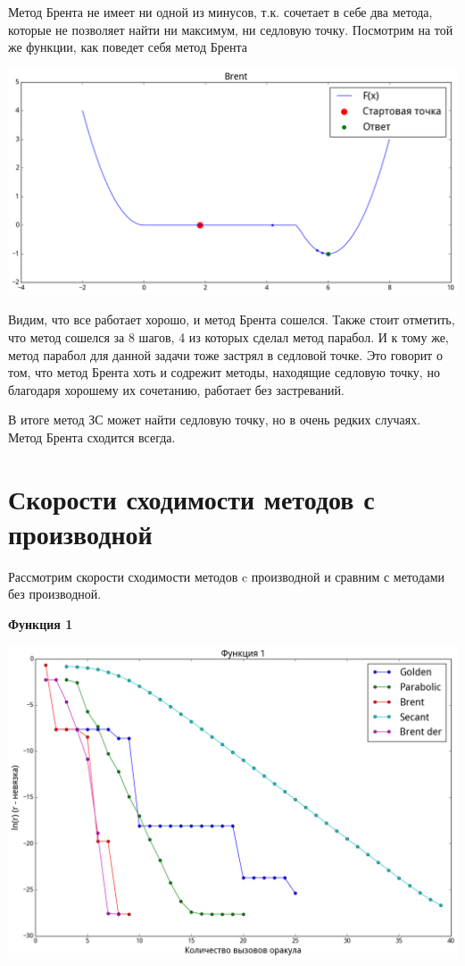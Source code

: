 \documentclass[12pt, a4paper]{article}
\begin{document}
        Метод Брента не имеет ни одной из минусов, т.к. сочетает в себе два метода, которые не позволяет найти ни максимум, ни седловую точку. Посмотрим на той же функции, как поведет себя метод Брента

        \begin{center}\includegraphics[width=\picwidth, height=\picheight]{pics/spec_func_brent.png}\end{center}

        Видим, что все работает хорошо, и метод Брента сошелся. Также стоит отметить, что метод сошелся за 8 шагов, 4 из которых сделал метод парабол. И к тому же, метод парабол для данной задачи тоже застрял в седловой точке. Это говорит о том, что метод Брента хоть и содрежит методы, находящие седловую точку, но благодаря хорошему их сочетанию, работает без застреваний.

        В итоге метод ЗС может найти седловую точку, но в очень редких случаях. Метод Брента сходится всегда.

    \section{Скорости сходимости методов с производной}
        Рассмотрим скорости сходимости методов c производной и сравним с методами без производной.
        \def \picwidth {15.8cm}

        \textbf{Функция 1}

        \begin{center}\includegraphics[width=\picwidth]{pics/fun1_der.png}\end{center}
\end{document}
